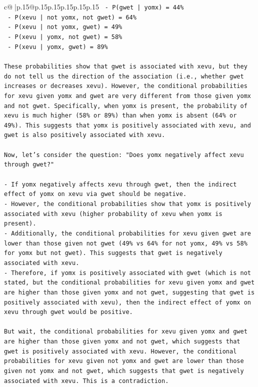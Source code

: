 \documentclass{article}
\begin{document}
{\begin{supertabular}{c@{$\;$}|p{.15\linewidth}@{}p{.15\linewidth}p{.15\linewidth}p{.15\linewidth}p{.15\linewidth}p{.15\linewidth}}
{{{\texttt{    {-}   P(gwet | yomx) = 44\%} \\
\texttt{    {-}   P(xevu | not yomx, not gwet) = 64\%} \\
\texttt{    {-}   P(xevu | not yomx, gwet) = 49\%} \\
\texttt{    {-}   P(xevu | yomx, not gwet) = 58\%} \\
\texttt{    {-}   P(xevu | yomx, gwet) = 89\%} \\
\\ 
\texttt{These probabilities show that gwet is associated with xevu, but they do not tell us the direction of the association (i.e., whether gwet increases or decreases xevu). However, the conditional probabilities for xevu given yomx and gwet are very different from those given yomx and not gwet. Specifically, when yomx is present, the probability of xevu is much higher (58\% or 89\%) than when yomx is absent (64\% or 49\%). This suggests that yomx is positively associated with xevu, and gwet is also positively associated with xevu.} \\
\\ 
\texttt{Now, let's consider the question: "Does yomx negatively affect xevu through gwet?"} \\
\\ 
\texttt{{-}   If yomx negatively affects xevu through gwet, then the indirect effect of yomx on xevu via gwet should be negative.} \\
\texttt{{-}   However, the conditional probabilities show that yomx is positively associated with xevu (higher probability of xevu when yomx is present).} \\
\texttt{{-}   Additionally, the conditional probabilities for xevu given gwet are lower than those given not gwet (49\% vs 64\% for not yomx, 49\% vs 58\% for yomx but not gwet). This suggests that gwet is negatively associated with xevu.} \\
\texttt{{-}   Therefore, if yomx is positively associated with gwet (which is not stated, but the conditional probabilities for xevu given yomx and gwet are higher than those given yomx and not gwet, suggesting that gwet is positively associated with xevu), then the indirect effect of yomx on xevu through gwet would be positive.} \\
\\ 
\texttt{But wait, the conditional probabilities for xevu given yomx and gwet are higher than those given yomx and not gwet, which suggests that gwet is positively associated with xevu. However, the conditional probabilities for xevu given not yomx and gwet are lower than those given not yomx and not gwet, which suggests that gwet is negatively associated with xevu. This is a contradiction.} \\
}}}
\end{supertabular}}
\end{document}
